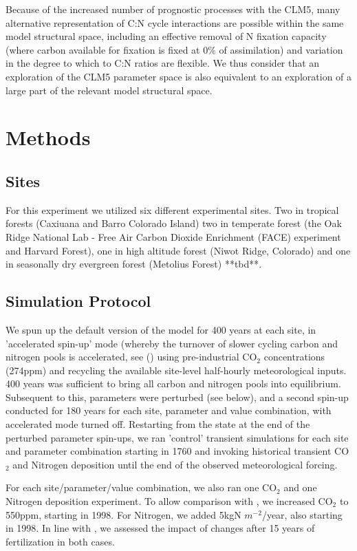 \documentclass[draft,linenumbers]{agujournal}
\begin{document}
Because of the increased number of prognostic processes with the CLM5, many alternative representation of C:N cycle interactions are possible within the same model structural space, including an effective removal of N fixation capacity (where carbon available for fixation is fixed at 0$\%$ of assimilation) and variation in the degree to which to C:N ratios are flexible. We thus consider that an exploration of the CLM5 parameter space is also equivalent to an exploration of a large part of the relevant model structural space.

\section{Methods}

\subsection{Sites}

For this experiment we utilized six different experimental sites. Two in tropical forests (Caxiuana and Barro Colorado Island) two in temperate forest (the Oak Ridge National Lab - Free Air Carbon Dioxide Enrichment (FACE) experiment and Harvard Forest), one in high altitude forest (Niwot Ridge, Colorado) and one in seasonally dry evergreen forest (Metolius Forest) **tbd**.

\subsection{Simulation Protocol}
We spun up the default version of the model for 400 years at each site, in 'accelerated spin-up' mode (whereby the turnover of slower cycling carbon and nitrogen pools is accelerated, see (\cite{lawrence2018}) using pre-industrial CO$_{2}$ concentrations (274ppm) and recycling the available site-level half-hourly meteorological inputs. 400 years was sufficient to bring all carbon and nitrogen pools into equilibrium. Subsequent to this, parameters were perturbed (see below), and a second spin-up conducted for 180 years for each site, parameter and value combination, with accelerated mode turned off. Restarting from the state at the end of the perturbed parameter spin-ups, we ran 'control' transient simulations for each site and parameter combination starting in 1760 and invoking historical transient CO$_{2}$ and Nitrogen deposition until the end of the observed meteorological forcing.

For each site/parameter/value combination, we also ran one CO$_{2}$ and one Nitrogen deposition experiment. To allow comparison with \cite{wieder}, we increased CO$_{2}$ to 550ppm, starting in 1998. For Nitrogen, we added 5kgN $m^{-2}$/year, also starting in 1998. In line with \cite{wieder}, we assessed the impact of changes after 15 years of fertilization in both cases.
\end{document}

